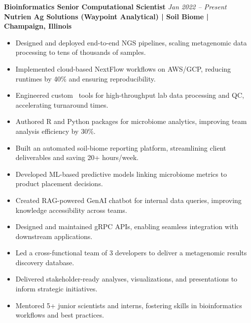 
\newcommand{\Job}[4]{%
  \noindent\textbf{#1} \hfill \textit{#3}\\
  \textbf{#2}\\
  \begin{addmargin}[1cm]{2cm}
    #4
  \end{addmargin}
  \sectionvspace
}
\newcommand{\JobItem}[1]{\item #1}


\Job
  {Bioinformatics Senior Computational Scientist}
  {Nutrien Ag Solutions (Waypoint Analytical) | Soil Biome | Champaign, Illinois}
  {Jan 2022 – Present}
  {
    \begin{itemize}[left=-0.2cm, itemsep=-0.15cm]
      \JobItem{Designed and deployed end-to-end NGS pipelines, scaling metagenomic data processing to tens of thousands of samples.}
      \JobItem{Implemented cloud-based NextFlow workflows on AWS/GCP, reducing runtimes by 40\% and ensuring reproducibility.}
      \JobItem{Engineered custom \CC\ tools for high-throughput lab data processing and QC, accelerating turnaround times.}
      \JobItem{Authored R and Python packages for microbiome analytics, improving team analysis efficiency by 30\%.}
      \JobItem{Built an automated soil-biome reporting platform, streamlining client deliverables and saving 20+ hours/week.}
      \JobItem{Developed ML-based predictive models linking microbiome metrics to product placement decisions.}
      \JobItem{Created RAG-powered GenAI chatbot for internal data queries, improving knowledge accessibility across teams.}
      \JobItem{Designed and maintained gRPC APIs, enabling seamless integration with downstream applications.}
      \JobItem{Led a cross-functional team of 3 developers to deliver a metagenomic results discovery database.}
      \JobItem{Delivered stakeholder-ready analyses, visualizations, and presentations to inform strategic initiatives.}
      \JobItem{Mentored 5+ junior scientists and interns, fostering skills in bioinformatics workflows and best practices.}
    \end{itemize}
  }

